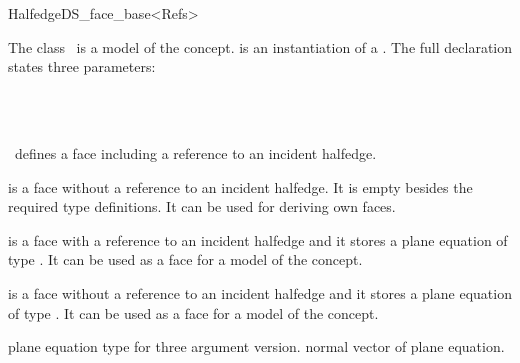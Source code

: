 
\ccRefPageBegin



\begin{ccRefClass}{HalfedgeDS_face_base<Refs>}
  
\ccDefinition
  
The class \ccRefName\ is a model of the 
concept.  is an instantiation of a . 
The full declaration states three parameters:

~~~~~~\\
\mbox{}~~~~~~

\ccRefName\ defines a face including a reference to an incident halfedge.

 is a face
without a reference to an incident halfedge. It is empty besides the
required type definitions. It can be used for deriving own faces.

 is a face with
a reference to an incident halfedge and it stores a plane equation of
type .  It can be used as a face for a model of the
 concept.

 is a face
without a reference to an incident halfedge and it stores a plane
equation of type .  It can be used as a face for a
model of the  concept.


\ccIsModel


\ccTypes
{}
\ccThreeToTwo

    {plane equation type for three argument version.}
\ccGlue
{}
    {normal vector of plane equation.}


\end{ccRefClass}
